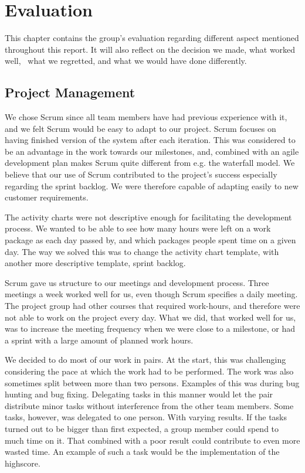 \chapter{Evaluation}

This chapter contains the group's evaluation regarding
different aspect mentioned throughout this report. It will also reflect
on the decision we made, what worked well, \ what we regretted, and
what we would have done differently. 

\section{Project Management}

We chose Scrum since all team members have had previous experience with
it, and we felt Scrum would be easy to adapt to our project. Scrum
focuses on having finished version of the system after each iteration.
This was considered to be an advantage in the work towards our
milestones, and, combined with an agile development plan makes Scrum
quite different from e.g. the waterfall model. We believe that our use
of Scrum contributed to the project's success
especially regarding the sprint backlog. We were therefore capable of
adapting easily to new customer requirements. 

The activity charts were not descriptive enough for facilitating the
development process. We wanted to be able to see how many hours were
left on a work package as each day passed by, and which packages people
spent time on a given day. The way we solved this was to change the
activity chart template, with another more descriptive template, sprint
backlog. 

Scrum gave us structure to our meetings and development process. Three
meetings a week worked well for us, even though Scrum specifies a daily
meeting. The project group had other courses that required work-hours,
and therefore were not able to work on the project every day. What we
did, that worked well for us, was to increase the meeting frequency
when we were close to a milestone, or had a sprint with a large amount
of planned work hours. 

We decided to do most of our work in pairs. At the start, this was
challenging considering the pace at which the work had to be performed.
The work was also sometimes split between more than two persons.
Examples of this was during bug hunting and bug fixing. Delegating
tasks in this manner would let the pair distribute minor tasks without
interference from the other team members. Some tasks, however, was
delegated to one person. With varying results. If the tasks turned out
to be bigger than first expected, a group member could spend to much
time on it. That combined with a poor result could contribute to even
more wasted time. An example of such a task would be the implementation
of the highscore. 

